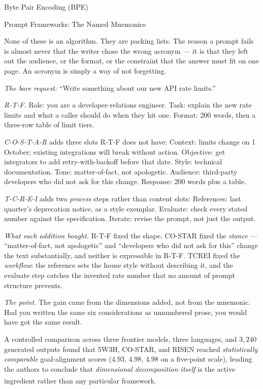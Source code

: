 \begin{v3topic}{Byte Pair Encoding (BPE)}
\begin{v3topic}{Prompt Frameworks: The Named Mnemonics}
\begin{plainlanguage}
None of these is an algorithm. They are packing lists. The reason a prompt
fails is almost never that the writer chose the wrong acronym --- it is that
they left out the audience, or the format, or the constraint that the answer
must fit on one page. An acronym is simply a way of not forgetting.
\end{plainlanguage}

\begin{workedexample}
\emph{The bare request:} ``Write something about our new API rate limits.''

\emph{R-T-F.}
\textsf{Role:} you are a developer-relations engineer.
\textsf{Task:} explain the new rate limits and what a caller should do when
they hit one.
\textsf{Format:} 200 words, then a three-row table of limit tiers.

\emph{C-O-S-T-A-R} adds three slots R-T-F does not have:
\textsf{Context:} limits change on 1 October; existing integrations will break
without action.
\textsf{Objective:} get integrators to add retry-with-backoff before that date.
\textsf{Style:} technical documentation.
\textsf{Tone:} matter-of-fact, not apologetic.
\textsf{Audience:} third-party developers who did not ask for this change.
\textsf{Response:} 200 words plus a table.

\emph{T-C-R-E-I} adds two \emph{process} steps rather than content slots:
\textsf{References:} last quarter's deprecation notice, as a style exemplar.
\textsf{Evaluate:} check every stated number against the specification.
\textsf{Iterate:} revise the prompt, not just the output.

\emph{What each addition bought.} R-T-F fixed the shape. CO-STAR fixed the
\emph{stance} --- ``matter-of-fact, not apologetic'' and ``developers who did
not ask for this'' change the text substantially, and neither is expressible
in R-T-F. TCREI fixed the \emph{workflow}: the reference sets the house style
without describing it, and the evaluate step catches the invented rate number
that no amount of prompt structure prevents.

\emph{The point.} The gain came from the dimensions added, not from the
mnemonic. Had you written the same six considerations as unnumbered prose,
you would have got the same result.
\end{workedexample}

\begin{engineernote}
A controlled comparison across three frontier models, three languages, and
$3{,}240$ generated outputs found that 5W3H, CO-STAR, and RISEN reached
\emph{statistically comparable} goal-alignment scores ($4.93$, $4.98$, $4.98$
on a five-point scale), leading the authors to conclude that
\emph{dimensional decomposition itself} is the active ingredient rather than
any particular
framework\textsuperscript{\cite{penggangStructuredIntentProtocol2026}}.


\end{engineernote}
\end{v3topic}
\end{v3topic}

